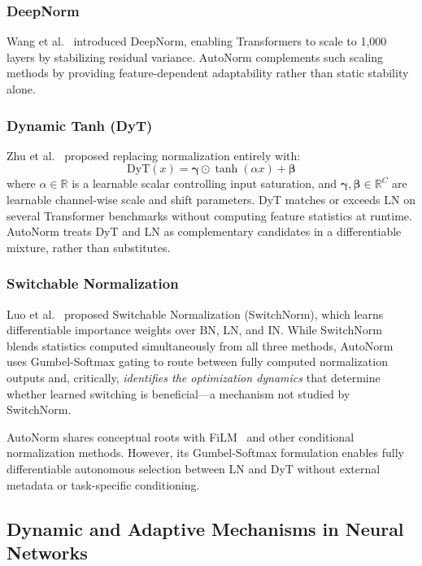 \documentclass[conference]{IEEEtran}
\begin{document}
\subsubsection{DeepNorm}
Wang et al.~\cite{wang2022deepnorm} introduced DeepNorm, enabling
Transformers to scale to 1,000 layers by stabilizing residual
variance. AutoNorm complements such scaling methods by providing
feature-dependent adaptability rather than static stability alone.

\subsubsection{Dynamic Tanh (DyT)}
Zhu et al.~\cite{zhu2025transformers} proposed replacing normalization
entirely with:
\begin{equation}
  \text{DyT}(x) = \boldsymbol{\gamma} \odot \tanh(\alpha x)
                + \boldsymbol{\beta}
  \label{eq:dyt}
\end{equation}
where $\alpha \in \mathbb{R}$ is a learnable scalar controlling input
saturation, and $\boldsymbol{\gamma}, \boldsymbol{\beta} \in
\mathbb{R}^{C}$ are learnable channel-wise scale and shift parameters.
DyT matches or exceeds LN on several Transformer benchmarks without
computing feature statistics at runtime. AutoNorm treats DyT and LN as
complementary candidates in a differentiable mixture, rather than
substitutes.

\subsubsection{Switchable Normalization}
Luo et al.~\cite{luo2019switchable} proposed Switchable Normalization
(SwitchNorm), which learns differentiable importance weights over BN,
LN, and IN. While SwitchNorm blends statistics computed simultaneously
from all three methods, AutoNorm uses Gumbel-Softmax gating to route
between fully computed normalization outputs and, critically,
\textit{identifies the optimization dynamics} that determine whether
learned switching is beneficial---a mechanism not studied by
SwitchNorm.

AutoNorm shares conceptual roots with FiLM~\cite{perez2018film} and
other conditional normalization methods. However, its Gumbel-Softmax
formulation enables fully differentiable autonomous selection between LN
and DyT without external metadata or task-specific conditioning.

\subsection{Dynamic and Adaptive Mechanisms in Neural Networks}
\end{document}
